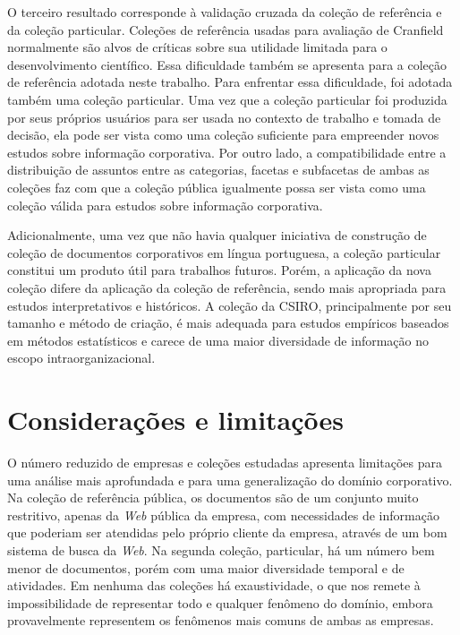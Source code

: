 O terceiro resultado corresponde à validação cruzada da coleção de referência e da coleção particular. Coleções de referência usadas para avaliação de Cranfield normalmente são alvos de críticas sobre sua utilidade limitada para o desenvolvimento científico. Essa dificuldade também se apresenta para a coleção de referência adotada neste trabalho. Para enfrentar essa dificuldade, foi adotada também uma coleção particular. Uma vez que a coleção particular foi produzida por seus próprios usuários para ser usada no contexto de trabalho e tomada de decisão, ela pode ser vista como uma coleção suficiente para empreender novos estudos sobre informação corporativa. Por outro lado, a compatibilidade entre a distribuição de assuntos entre as categorias, facetas e subfacetas de ambas as coleções faz com que a coleção pública igualmente possa ser vista como uma coleção válida para estudos sobre informação corporativa.

Adicionalmente, uma vez que não havia qualquer iniciativa de construção de coleção de documentos corporativos em língua portuguesa, a coleção particular constitui um produto útil para trabalhos futuros. Porém, a aplicação da nova coleção difere da aplicação da coleção de referência, sendo mais apropriada para estudos interpretativos e históricos. A coleção da CSIRO, principalmente por seu tamanho e método de criação, é mais adequada para estudos empíricos baseados em métodos estatísticos e carece de uma maior diversidade de informação no escopo intraorganizacional.


\section{Considerações e limitações}
\label{conclusao-limitacoes}


O número reduzido de empresas e coleções estudadas apresenta limitações para uma análise mais aprofundada e para uma generalização do domínio corporativo. Na coleção de referência pública, os documentos são de um conjunto muito restritivo, apenas da \textit{Web} pública da empresa, com necessidades de informação que poderiam ser atendidas pelo próprio cliente da empresa, através de um bom sistema de busca da \textit{Web}. Na segunda coleção, particular, há um número bem menor de documentos, porém com uma maior diversidade temporal e de atividades. Em nenhuma das coleções há exaustividade, o que nos remete à impossibilidade de representar todo e qualquer fenômeno do domínio, embora provavelmente representem os fenômenos mais comuns de ambas as empresas.

